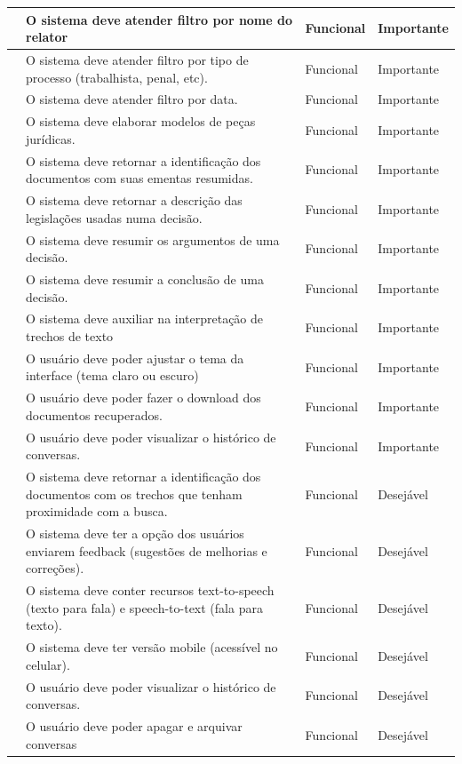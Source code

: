 \documentclass[
	12pt,				%
	openright,			%
	oneside,			    %
	a4paper,				%
	english,			%
	french,			%
	spanish,			%
	brazil			%
	]{abntex2}
\begin{document}
\begin{table}[htb]
\begin{tabular}{|>{\centering\arraybackslash}m{1.2cm}|>{\centering\arraybackslash}m{10cm}|>{\centering\arraybackslash}m{2.25cm}|>{\centering\arraybackslash}m{2.2cm}|}
    \hline
    [RF13] & O sistema deve atender filtro por nome do relator & Funcional & Importante \\
    \hline
    [RF14] & O sistema deve atender filtro por tipo de processo (trabalhista, penal, etc). & Funcional & Importante \\
    \hline
    [RF15] & O sistema deve atender filtro por data. & Funcional & Importante \\
    \hline
    [RF16] & O sistema deve elaborar modelos de peças jurídicas. & Funcional & Importante \\
    \hline
    [RF17] & O sistema deve retornar a identificação dos documentos com suas ementas resumidas. & Funcional & Importante \\
    \hline
    [RF18] & O sistema deve retornar a descrição das legislações usadas numa decisão. & Funcional & Importante \\
    \hline
    [RF19] & O sistema deve resumir os argumentos de uma decisão. & Funcional & Importante \\
    \hline
    [RF20] & O sistema deve resumir a conclusão de uma decisão. & Funcional & Importante \\
    \hline
    [RF21] & O sistema deve auxiliar na interpretação de trechos de texto & Funcional & Importante \\
    \hline
    [RF22] & O usuário deve poder ajustar o tema da interface (tema claro ou escuro) & Funcional & Importante \\
    \hline
    [RF23] & O usuário deve poder fazer o download dos documentos recuperados. & Funcional & Importante \\
    \hline
    [RF24] & O usuário deve poder visualizar o histórico de conversas. & Funcional & Importante \\
    \hline
    [RF25] & O sistema deve retornar a identificação dos documentos com os trechos que tenham proximidade com a busca. & Funcional & Desejável \\
    \hline
    [RF26] & O sistema deve ter a opção dos usuários enviarem feedback (sugestões de melhorias e correções). & Funcional & Desejável \\
    \hline
    [RF27] & O sistema deve conter recursos text-to-speech (texto para fala) e speech-to-text (fala para texto). & Funcional & Desejável \\
    \hline
    [RF28] & O sistema deve ter versão mobile (acessível no celular). & Funcional & Desejável \\
    \hline
    [RF29] & O usuário deve poder visualizar o histórico de conversas. & Funcional & Desejável \\
    \hline
    [RF30] & O usuário deve poder apagar e arquivar conversas & Funcional & Desejável \\
    \hline
\end{tabular}
\end{table}
\end{document}
